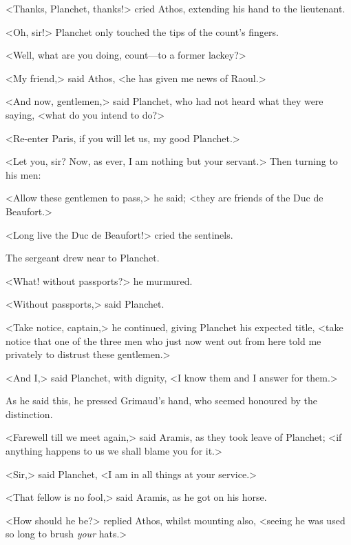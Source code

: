 <Thanks, Planchet, thanks!> cried Athos, extending his hand to the lieutenant.

<Oh, sir!> Planchet only touched the tips of the count's fingers.

<Well, what are you doing, count—to a former lackey?>

<My friend,> said Athos, <he has given me news of Raoul.>

<And now, gentlemen,> said Planchet, who had not heard what they were saying, <what do you intend to do?>

<Re-enter Paris, if you will let us, my good Planchet.>

<Let you, sir? Now, as ever, I am nothing but your servant.> Then turning to his men:

<Allow these gentlemen to pass,> he said; <they are friends of the Duc de Beaufort.>

<Long live the Duc de Beaufort!> cried the sentinels.

The sergeant drew near to Planchet.

<What! without passports?> he murmured.

<Without passports,> said Planchet.

<Take notice, captain,> he continued, giving Planchet his expected title, <take notice that one of the three men who just now went out from here told me privately to distrust these gentlemen.>

<And I,> said Planchet, with dignity, <I know them and I answer for them.>

As he said this, he pressed Grimaud's hand, who seemed honoured by the distinction.

<Farewell till we meet again,> said Aramis, as they took leave of Planchet; <if anything happens to us we shall blame you for it.>

<Sir,> said Planchet, <I am in all things at your service.>

<That fellow is no fool,> said Aramis, as he got on his horse.

<How should he be?> replied Athos, whilst mounting also, <seeing he was used so long to brush \emph{your} hats.> 